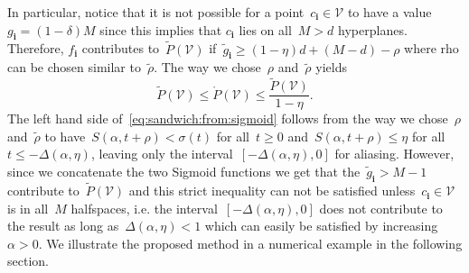 \documentclass[letterpaper, 10pt, conference]{ieeeconf} %
\providecommand{\bfa}[1]{\mathbf{#1}}
\begin{document}
%
In particular, notice that it is not possible for a point~$c_\bfa{i}\in\mathcal V$ to have a value~$g_\bfa{i}=(1-\delta)M$ since this implies that $c_\bfa{i}$ lies on all~$M>d$ hyperplanes.
%
Therefore, $f_\bfa{i}$ contributes to~$\tilde{P}(\mathcal V)$ if~$\tilde g_\bfa{i}\geq(1-\eta)d+(M-d)-\rho$ where rho can be chosen similar to~$\tilde\rho$.
%
The way we chose~$\rho$ and~$\tilde\rho$ yields
%
\begin{equation}\label{eq:sandwich:from:sigmoid}
	\tilde P(\mathcal V)\leq\mathring P(\mathcal V)\leq \frac{\tilde P(\mathcal V)}{1-\eta}.
\end{equation}
%
The left hand side of~\eqref{eq:sandwich:from:sigmoid} follows from the way we chose~$\rho$ and~$\tilde\rho$ to have~$S(\alpha,t+\rho)<\sigma(t)$ for all~$t\geq0$ and~$S(\alpha,t+\rho)\leq\eta$ for all~$t\leq -\Delta(\alpha,\eta)$, leaving only the interval~$[-\Delta(\alpha,\eta),0]$ for aliasing.
%
However, since we concatenate the two Sigmoid functions we get that the~$\tilde g_\bfa{i}>M-1$ contribute to~$\tilde P(\mathcal V)$ and this strict inequality can not be satisfied unless~$c_\bfa{i}\in\mathcal V$ is in all~$M$ halfspaces, i.e. the interval~$[-\Delta(\alpha,\eta),0]$ does not contribute to the result as long as~$\Delta(\alpha,\eta)<1$ which can easily be satisfied by increasing~$\alpha>0$.
%
We illustrate the proposed method in a numerical example in the following section.
\end{document}
